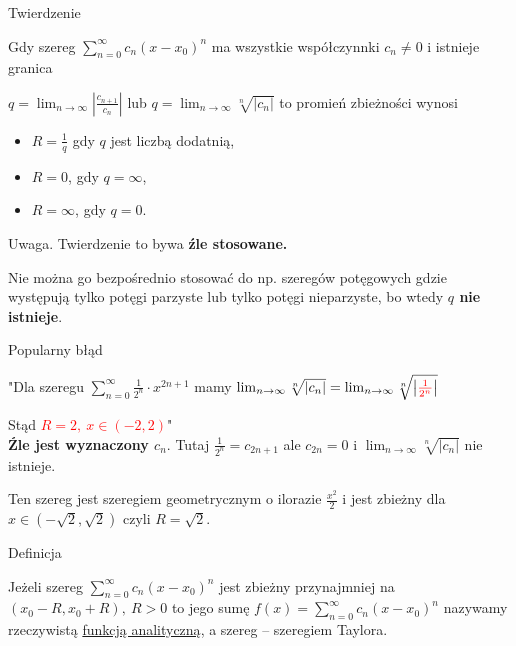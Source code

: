 \begin{tw}{Twierdzenie}

Gdy szereg $ \sum\limits_{n = 0}^{\infty} c_n(x - x_0)^n $ ma wszystkie współczynnki $ c_n \neq 0 $ i istnieje granica

$ q = \lim_{n \to \infty} \left| \frac{c_{n + 1}}{c_n} \right| $ lub $ q = \lim_{n \to \infty} \sqrt[n]{|c_n|} $
to promień zbieżności wynosi 

\begin{itemize}
    \item $ R = \frac{1}{q} $ gdy $q$ jest liczbą dodatnią,
    \item $ R = 0$, gdy $q = \infty$,
    \item $ R = \infty $, gdy $ q = 0 $. \\
\end{itemize}
\end{tw}

Uwaga. Twierdzenie to bywa \textbf{źle stosowane.}

Nie można go bezpośrednio stosować do np. szeregów potęgowych gdzie występują tylko potęgi parzyste lub tylko
potęgi nieparzyste, bo wtedy \textbf{$q$ nie istnieje}. \\

\begin{blad}{Popularny błąd}

"Dla szeregu $ \sum\limits_{n = 0}^{\infty} \frac{1}{2^n} \cdot x^{2n + 1} $ mamy 
$ \lim_{n \to \infty} \sqrt[n]{|c_n|} = \lim_{n \to \infty} \sqrt[n]{ \left| \textcolor{red}{\frac{1}{2^n}} \right| } $

Stąd \textcolor{red}{$ R = 2, \ x \in (-2, 2) $}" \\

\textbf{Źle jest wyznaczony $c_n$}. Tutaj $ \frac{1}{2^n} = c_{2n + 1} $ ale $ c_{2n} = 0 $ i
$ \lim_{n \to \infty} \sqrt[n]{|c_n|} $ nie istnieje.

Ten szereg jest szeregiem geometrycznym o ilorazie $ \frac{x^2}{2} $ i jest zbieżny dla $ x \in (-\sqrt{2}, \sqrt{2}) $
czyli $ R = \sqrt{2} $.
\end{blad}

\begin{tw}{Definicja}

Jeżeli szereg $ \sum\limits_{n = 0}^{\infty} c_n(x - x_0)^n $ jest zbieżny przynajmniej na $ (x_0 - R, x_0 + R), \ R > 0 $ to
jego sumę $ f(x) = \sum\limits_{n = 0}^{\infty} c_n(x - x_0)^n $ nazywamy rzeczywistą \underline{funkcją analityczną}, a szereg
-- szeregiem Taylora.
\end{tw}


